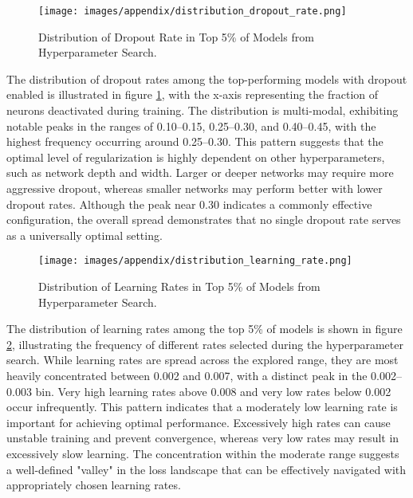 \begin{figure}[H]
	\centering
	\texttt{[image: images/appendix/distribution\_dropout\_rate.png]}
	\caption{Distribution of Dropout Rate in Top 5\% of Models from Hyperparameter Search.}
	\label{fig:distribution_dropout}
\end{figure}
The distribution of dropout rates among the top-performing models with dropout enabled is illustrated in figure \ref{fig:distribution_dropout}, with the x-axis representing the fraction of neurons deactivated during training. The distribution is multi-modal, exhibiting notable peaks in the ranges of 0.10–0.15, 0.25–0.30, and 0.40–0.45, with the highest frequency occurring around 0.25–0.30. This pattern suggests that the optimal level of regularization is highly dependent on other hyperparameters, such as network depth and width. Larger or deeper networks may require more aggressive dropout, whereas smaller networks may perform better with lower dropout rates. Although the peak near 0.30 indicates a commonly effective configuration, the overall spread demonstrates that no single dropout rate serves as a universally optimal setting.

\begin{figure}[H]
	\centering
	\texttt{[image: images/appendix/distribution\_learning\_rate.png]}
	\caption{Distribution of Learning Rates in Top 5\% of Models from Hyperparameter Search.}
	\label{fig:distribution_learning_rate}
\end{figure}
The distribution of learning rates among the top 5\% of models is shown in figure \ref{fig:distribution_learning_rate}, illustrating the frequency of different rates selected during the hyperparameter search. While learning rates are spread across the explored range, they are most heavily concentrated between 0.002 and 0.007, with a distinct peak in the 0.002–0.003 bin. Very high learning rates above 0.008 and very low rates below 0.002 occur infrequently. This pattern indicates that a moderately low learning rate is important for achieving optimal performance. Excessively high rates can cause unstable training and prevent convergence, whereas very low rates may result in excessively slow learning. The concentration within the moderate range suggests a well-defined "valley" in the loss landscape that can be effectively navigated with appropriately chosen learning rates.

